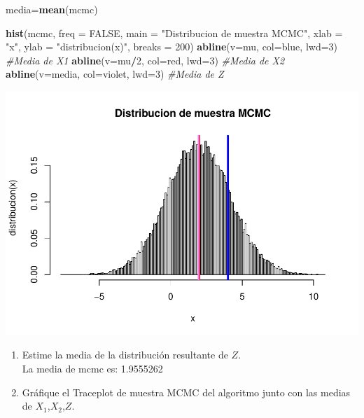 \documentclass[
]{article}
\newenvironment{Shaded}{\begin{snugshade}}{\end{snugshade}}
\newcommand{\AttributeTok}[1]{\textcolor[rgb]{0.13,0.29,0.53}{#1}}
\newcommand{\CommentTok}[1]{\textcolor[rgb]{0.56,0.35,0.01}{\textit{#1}}}
\newcommand{\ConstantTok}[1]{\textcolor[rgb]{0.56,0.35,0.01}{#1}}
\newcommand{\DecValTok}[1]{\textcolor[rgb]{0.00,0.00,0.81}{#1}}
\newcommand{\FunctionTok}[1]{\textcolor[rgb]{0.13,0.29,0.53}{\textbf{#1}}}
\newcommand{\NormalTok}[1]{#1}
\newcommand{\OtherTok}[1]{\textcolor[rgb]{0.56,0.35,0.01}{#1}}
\newcommand{\SpecialCharTok}[1]{\textcolor[rgb]{0.81,0.36,0.00}{\textbf{#1}}}
\newcommand{\StringTok}[1]{\textcolor[rgb]{0.31,0.60,0.02}{#1}}
\begin{document}
\begin{Shaded}
\begin{Highlighting}[]
\NormalTok{media}\OtherTok{=}\FunctionTok{mean}\NormalTok{(mcmc)}

\FunctionTok{hist}\NormalTok{(mcmc,}
\AttributeTok{freq =} \ConstantTok{FALSE}\NormalTok{,}
\AttributeTok{main =} \StringTok{"Distribucion de muestra MCMC"}\NormalTok{,}
\AttributeTok{xlab =} \StringTok{"x"}\NormalTok{,}
\AttributeTok{ylab =} \StringTok{"distribucion(x)"}\NormalTok{,}
\AttributeTok{breaks =} \DecValTok{200}\NormalTok{)}
\FunctionTok{abline}\NormalTok{(}\AttributeTok{v=}\NormalTok{mu, }\AttributeTok{col=}\StringTok{\textquotesingle{}blue\textquotesingle{}}\NormalTok{, }\AttributeTok{lwd=}\DecValTok{3}\NormalTok{)      }\CommentTok{\#Media de X1}
\FunctionTok{abline}\NormalTok{(}\AttributeTok{v=}\NormalTok{mu}\SpecialCharTok{/}\DecValTok{2}\NormalTok{, }\AttributeTok{col=}\StringTok{\textquotesingle{}red\textquotesingle{}}\NormalTok{, }\AttributeTok{lwd=}\DecValTok{3}\NormalTok{)     }\CommentTok{\#Media de X2}
\FunctionTok{abline}\NormalTok{(}\AttributeTok{v=}\NormalTok{media, }\AttributeTok{col=}\StringTok{\textquotesingle{}violet\textquotesingle{}}\NormalTok{, }\AttributeTok{lwd=}\DecValTok{3}\NormalTok{) }\CommentTok{\#Media de Z}
\end{Highlighting}
\end{Shaded}

\includegraphics{tarea2_files/figure-latex/unnamed-chunk-24-1.pdf}

\begin{enumerate}
\def\labelenumi{\alph{enumi}.}
\setcounter{enumi}{2}
\item
  Estime la media de la distribución resultante de \(𝑍\).\\
  La media de mcmc es: 1.9555262
\item
  Gráfique el Traceplot de muestra MCMC del algoritmo junto con las
  medias de \(𝑋_1\),\(𝑋_2\),\(𝑍\).
\end{enumerate}
\end{document}
